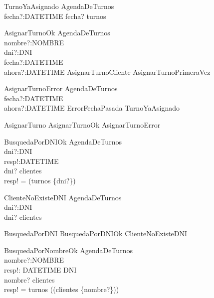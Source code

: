 \begin{schema}{TurnoYaAsignado}
\Xi AgendaDeTurnos \\
fecha?:DATETIME
\where
fecha? \in \dom turnos
\end{schema}

\begin{schema}{AsignarTurnoOk}
\Delta AgendaDeTurnos \\
nombre?:NOMBRE \\
dni?:DNI \\
fecha?:DATETIME \\
ahora?:DATETIME
\where
AsignarTurnoCliente \lor AsignarTurnoPrimeraVez
\end{schema}

\begin{schema}{AsignarTurnoError}
\Xi AgendaDeTurnos \\
fecha?:DATETIME \\
ahora?:DATETIME
\where
ErrorFechaPasada \lor TurnoYaAsignado
\end{schema}

\begin{zed}
AsignarTurno  AsignarTurnoOk \lor AsignarTurnoError
\end{zed}

\begin{schema}{BusquedaPorDNIOk}
\Xi AgendaDeTurnos \\
dni?:DNI \\
resp!:\power DATETIME \\
\where
dni? \in \dom clientes \\
resp! = \dom(turnos \rres \{dni?\})
\end{schema}

\begin{schema}{ClienteNoExisteDNI}
\Xi AgendaDeTurnos \\
dni?:DNI \\
\where
dni? \notin \dom clientes
\end{schema}

\begin{zed}
BusquedaPorDNI  BusquedaPorDNIOk \lor ClienteNoExisteDNI
\end{zed}

\begin{schema}{BusquedaPorNombreOk}
\Xi AgendaDeTurnos \\
nombre?:NOMBRE \\
resp!: DATETIME \pfun DNI \\
\where
nombre? \in \ran clientes \\
resp! = turnos \rres (\dom (clientes \rres \{nombre?\}))
\end{schema}

